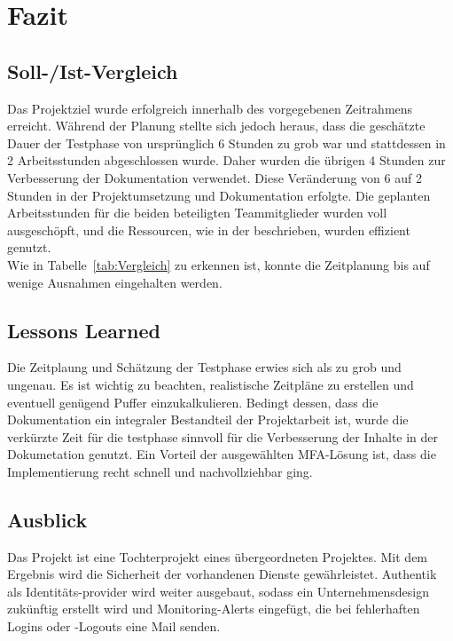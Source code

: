 \section{Fazit} 
\label{sec:Fazit}

\subsection{Soll-/Ist-Vergleich}
\label{sec:SollIstVergleich}
Das Projektziel wurde erfolgreich innerhalb des vorgegebenen Zeitrahmens erreicht. Während der Planung stellte sich jedoch heraus, dass die 
geschätzte Dauer der Testphase von ursprünglich 6 Stunden zu grob war und stattdessen in 2 Arbeitsstunden abgeschlossen wurde. Daher wurden die 
übrigen 4 Stunden zur Verbesserung der Dokumentation verwendet. Diese Veränderung von 6 auf 2 Stunden in der Projektumsetzung und Dokumentation 
erfolgte. Die geplanten Arbeitsstunden für die beiden beteiligten Teammitglieder wurden voll ausgeschöpft, und die Ressourcen, wie in der 
 beschrieben, wurden effizient genutzt.
\\Wie in Tabelle~\ref{tab:Vergleich}  zu erkennen ist, konnte die Zeitplanung bis auf wenige Ausnahmen eingehalten werden.

\subsection{Lessons Learned}
\label{sec:LessonsLearned}
Die Zeitplaung und Schätzung der Testphase erwies sich als zu grob und ungenau. Es ist wichtig zu beachten, realistische Zeitpläne zu erstellen 
und eventuell genügend Puffer einzukalkulieren. Bedingt dessen, dass die Dokumentation ein integraler Bestandteil der Projektarbeit ist, 
wurde die verkürzte Zeit für die testphase sinnvoll für die Verbesserung der Inhalte in der Dokumetation genutzt. Ein Vorteil der 
ausgewählten \acs{MFA}-Lösung ist, dass die Implementierung recht schnell und nachvollziehbar ging.

\subsection{Ausblick}
\label{sec:Ausblick}
Das Projekt ist eine Tochterprojekt eines übergeordneten Projektes. Mit dem Ergebnis wird die Sicherheit der vorhandenen Dienste gewährleistet. 
Authentik als Identitäts-provider wird weiter ausgebaut, sodass ein Unternehmensdesign zukünftig erstellt wird und Monitoring-Alerts eingefügt, 
die bei fehlerhaften Logins oder -Logouts eine Mail senden.
